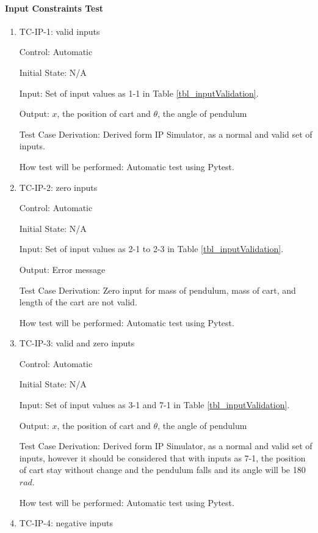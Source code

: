 \documentclass[12pt, titlepage]{article}
\begin{document}
 
\paragraph{Input Constraints Test}

\begin{enumerate}

\item{TC-IP-1: valid inputs}

Control: Automatic
					
Initial State: N/A 
					
Input: Set of input values as 1-1 in Table \ref{tbl_inputValidation}.
					
Output: $x$, the position of cart and $\theta$, the angle of pendulum

Test Case Derivation: Derived form IP Simulator, as a normal and valid set of inputs.
					
How test will be performed: Automatic test using Pytest.

\item{TC-IP-2: zero inputs}

Control: Automatic
					
Initial State: N/A 
					
Input: Set of input values as 2-1 to 2-3 in Table \ref{tbl_inputValidation}.
					
Output: Error message

Test Case Derivation: Zero input for mass of pendulum, mass of cart, and length of the cart are not valid.
					
How test will be performed: Automatic test using Pytest.

\item{TC-IP-3: valid and zero inputs}

Control: Automatic
					
Initial State: N/A 
					
Input: Set of input values as 3-1  and 7-1 in Table \ref{tbl_inputValidation}.
					
Output: $x$, the position of cart and $\theta$, the angle of pendulum

Test Case Derivation: Derived form IP Simulator, as a normal and valid set of inputs, however it should be considered that with inputs as 7-1, the position of cart stay without change and the pendulum falls and its angle will be 180 $rad$.
					
How test will be performed: Automatic test using Pytest.

\item{TC-IP-4: negative inputs}


\end{enumerate}
\end{document}
